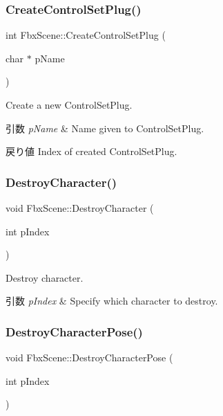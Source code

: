 \subsubsection{\texorpdfstring{Create\+Control\+Set\+Plug()}{CreateControlSetPlug()}}
{\footnotesize\ttfamily int Fbx\+Scene\+::\+Create\+Control\+Set\+Plug (\begin{DoxyParamCaption}\item[{char $\ast$}]{p\+Name }\end{DoxyParamCaption})}

Create a new Control\+Set\+Plug. 
\begin{DoxyParams}{引数}
{\em p\+Name} & Name given to Control\+Set\+Plug. \\
\hline
\end{DoxyParams}
\begin{DoxyReturn}{戻り値}
Index of created Control\+Set\+Plug. 
\end{DoxyReturn}
\mbox{\label{class_fbx_scene_ade61cc3b6e1e0fc8fbfb7d664b1d59b1}} 
\subsubsection{\texorpdfstring{Destroy\+Character()}{DestroyCharacter()}}
{\footnotesize\ttfamily void Fbx\+Scene\+::\+Destroy\+Character (\begin{DoxyParamCaption}\item[{int}]{p\+Index }\end{DoxyParamCaption})}

Destroy character. 
\begin{DoxyParams}{引数}
{\em p\+Index} & Specify which character to destroy. \\
\hline
\end{DoxyParams}
\mbox{\label{class_fbx_scene_ac7c105c120c3df3e757354e843c027f1}} 
\subsubsection{\texorpdfstring{Destroy\+Character\+Pose()}{DestroyCharacterPose()}}
{\footnotesize\ttfamily void Fbx\+Scene\+::\+Destroy\+Character\+Pose (\begin{DoxyParamCaption}\item[{int}]{p\+Index }\end{DoxyParamCaption})}

